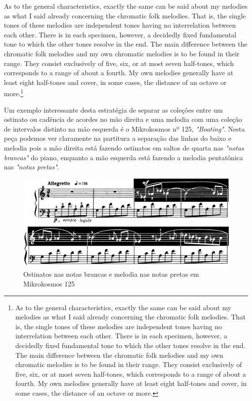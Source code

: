 \documentclass[
	12pt,				%
	openright,			%
	twoside,			%
	a4paper,			%
	english,			%
	french,				%
	spanish,			%
	brazil				%
	]{abntex2}
\begin{document}
\begin{citacao}
As to the general characteristics, exactly the same can be said about my melodies as what I said already
concerning the chromatic folk melodies. That is, the single tones of these melodies are independent tones having no interrelation between each other. There is in each specimen, however, a decidedly fixed
fundamental tone to which the other tones resolve in the end. The main difference between the chromatic folk melodies and my own chromatic melodies is to be found in their range. They consist exclusively of five, six, or at most seven half-tones, which corresponds to a range of about a fourth. My own melodies generally have at least eight half-tones and cover, in some cases, the distance of an octave or more.\cite[p. 381]{bartok1993bela}\footnote{
As to the general characteristics, exactly the same can be said about my melodies as what I said already
concerning the chromatic folk melodies. That is, the single tones of these melodies are independent tones having no interrelation between each other. There is in each specimen, however, a decidedly fixed
fundamental tone to which the other tones resolve in the end. The main difference between the chromatic folk melodies and my own chromatic melodies is to be found in their range. They consist exclusively of five, six, or at most seven half-tones, which corresponds to a range of about a fourth. My own melodies generally have at least eight half-tones and cover, in some cases, the distance of an octave or more.\cite[p. 381]{bartok1993bela}}
\end{citacao}

\pagebreak
Um exemplo interessante desta estratégia de separar as coleções entre um ostinato ou cadência de acordes no mão direita e uma melodia com uma coleção de intervalos distinto na mão esquerda é o Mikrokosmos nº 125, \textit{"Boating"}. Nesta peça podemos ver claramente na partitura a separação das linhas do baixo e melodia pois a mão direita está fazendo ostinatos em saltos de quarta nas \textit{"notas brancas"} do piano, enquanto a mão esquerda está fazendo a melodia pentatônica nas \textit{"notas pretas"}. 

\begin{figure}[!h]
	\caption{\label{fig_grafico}Ostinatos nas notas brancas e melodia nas notas pretas em Mikrokosmos 125 }
	\begin{center}
	    \includegraphics[scale=0.3]{ostinatos/boating_ostinato.png}
	\end{center}
\end{figure}
\end{document}
